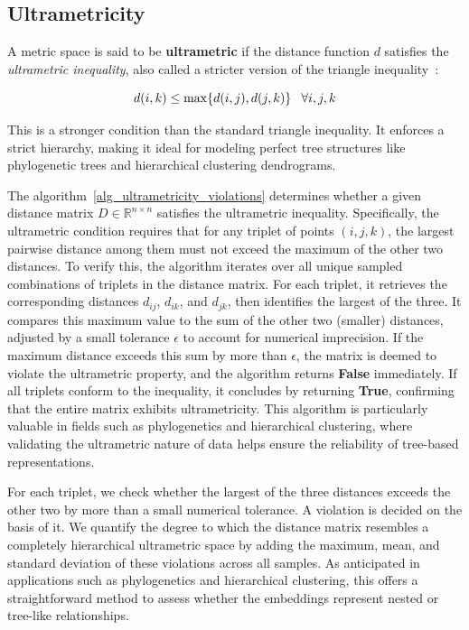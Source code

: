 \documentclass[]{Liebert_Author_revised}
\begin{document}


\subsection{Ultrametricity}

A metric space is said to be \textbf{ultrametric} if the distance function $d$ satisfies the \textit{ultrametric inequality}, also called a stricter version of the triangle inequality~\citeauthor{chierchia2019ultrametric}:

\begin{equation}
    \scriptsize
    d(i, k) \leq \max\{d(i, j), d(j, k)\} \quad \forall i, j, k
\end{equation}

This is a stronger condition than the standard triangle inequality. It enforces a strict hierarchy, making it ideal for modeling perfect tree structures like phylogenetic trees and hierarchical clustering dendrograms.


The algorithm~\ref{alg_ultrametricity_violations} determines whether a given distance matrix \( D \in \mathbb{R}^{n \times n} \) satisfies the ultrametric inequality. Specifically, the ultrametric condition requires that for any triplet of points \( (i, j, k) \), the largest pairwise distance among them must not exceed the maximum of the other two distances. To verify this, the algorithm iterates over all unique sampled combinations of triplets in the distance matrix. For each triplet, it retrieves the corresponding distances \( d_{ij} \), \( d_{ik} \), and \( d_{jk} \), then identifies the largest of the three. It compares this maximum value to the sum of the other two (smaller) distances, adjusted by a small tolerance \( \epsilon \) to account for numerical imprecision. If the maximum distance exceeds this sum by more than \( \epsilon \), the matrix is deemed to violate the ultrametric property, and the algorithm returns \textbf{False} immediately. If all triplets conform to the inequality, it concludes by returning \textbf{True}, confirming that the entire matrix exhibits ultrametricity. This algorithm is particularly valuable in fields such as phylogenetics and hierarchical clustering, where validating the ultrametric nature of data helps ensure the reliability of tree-based representations.

For each triplet, we check whether the largest of the three distances exceeds the other two by more than a small numerical tolerance. A violation is decided on the basis of it. We quantify the degree to which the distance matrix resembles a completely hierarchical ultrametric space by adding the maximum, mean, and standard deviation of these violations across all samples. As anticipated in applications such as phylogenetics and hierarchical clustering, this offers a straightforward method to assess whether the embeddings represent nested or tree-like relationships.
\end{document}

